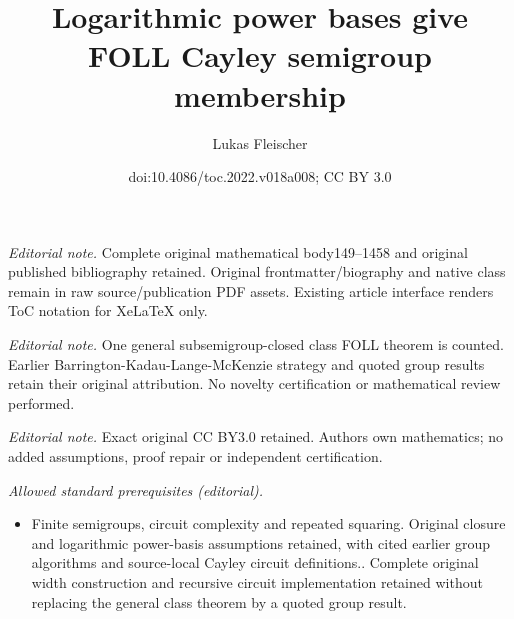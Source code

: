 \documentclass[11pt]{article}
\title{Logarithmic power bases give FOLL Cayley semigroup membership}
\author{Lukas Fleischer}
\date{doi:10.4086/toc.2022.v018a008; CC BY 3.0}
\numberwithin{equation}{section}
\theoremstyle{definition}
\theoremstyle{plain}
\begin{document}
\maketitle
\noindent\textit{Editorial note.} Complete original mathematical body149--1458 and original published bibliography retained. Original frontmatter/biography and native class remain in raw source/publication PDF assets. Existing article interface renders ToC notation for XeLaTeX only.\par\medskip
\noindent\textit{Editorial note.} One general subsemigroup-closed class FOLL theorem is counted. Earlier Barrington-Kadau-Lange-McKenzie strategy and quoted group results retain their original attribution. No novelty certification or mathematical review performed.\par\medskip
\noindent\textit{Editorial note.} Exact original CC BY3.0 retained. Authors own mathematics; no added assumptions, proof repair or independent certification.\par\medskip
\noindent\textit{Allowed standard prerequisites (editorial).}\begin{itemize}
\item Finite semigroups, circuit complexity and repeated squaring. Original closure and logarithmic power-basis assumptions retained, with cited earlier group algorithms and source-local Cayley circuit definitions.. Complete original width construction and recursive circuit implementation retained without replacing the general class theorem by a quoted group result.
\end{itemize}\medskip
\end{document}
